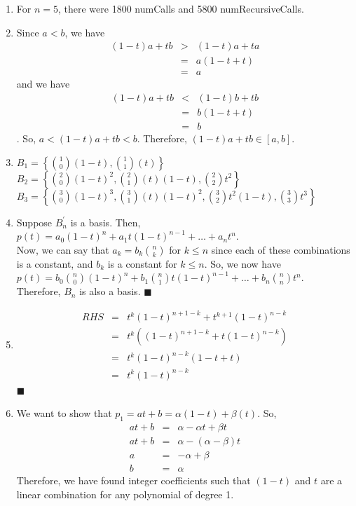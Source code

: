 \documentclass{article}
\newcommand*{\qed}{\hfill\ensuremath{\blacksquare}}
\begin{document}
\begin{enumerate}
\item For $n=5$, there were 1800 numCalls and 5800 numRecursiveCalls.

\item Since $a<b$, we have 
\begin{eqnarray*}
	(1-t)a + tb &>& (1-t)a + ta\\
	&=& a(1-t+t)\\
	&=& a
\end{eqnarray*}
and we have
\begin{eqnarray*}
	(1-t)a + tb &<& (1-t)b + tb\\
	&=& b(1-t+t)\\
	&=& b
\end{eqnarray*}
. So, $a < (1-t)a + tb < b$. Therefore, $(1-t)a + tb \in [a,b]$. 

\item $B_1 = \left\{{{1}\choose{0}} (1-t), {{1}\choose{1}} (t)\right\}$\\
$B_2 = \left\{{{2}\choose{0}} (1-t)^2, {{2}\choose{1}} (t)(1-t), {{2}\choose{2}} t^2 \right\}$\\
$B_3 = \left\{{{3}\choose{0}} (1-t)^3, {{3}\choose{1}} (t)(1-t)^2, {{3}\choose{2}} t^2(1-t), {{3}\choose{3}} t^3 \right\}$\\

\item Suppose $B_n^{'}$ is a basis. Then, \\
$p(t) = a_0(1-t)^n + a_1t(1-t)^{n-1} + \dots + a_nt^n$. \\
Now, we can say that $a_k = b_k {{n}\choose{k}}$ for $k\leq n$ since each of these combinations is a constant, and $b_k$ is a constant for $k \leq n$. So, we now have\\
$p(t) = b_0{{n}\choose{0}}(1-t)^n + b_1{{n}\choose{1}}t(1-t)^{n-1} + \dots + b_n{{n}\choose{n}}t^n$. \\
Therefore, $B_n$ is also a basis. \qed

\item 
\begin{eqnarray*}
	RHS &=& t^k(1-t)^{n+1-k} + t^{k+1}(1-t)^{n-k}\\
	&=& t^k((1-t)^{n+1-k}+t(1-t)^{n-k})\\
	&=& t^k(1-t)^{n-k}(1-t+t)\\
	&=& t^k(1-t)^{n-k} 
\end{eqnarray*}
\qed

\item We want to show that $p_1 = at + b = \alpha(1-t) + \beta(t)$. So, 
\begin{eqnarray*}
	at+b &=& \alpha - \alpha t + \beta t\\
	at+b &=& \alpha - (\alpha - \beta) t\\
	a &=& -\alpha + \beta\\
	b &=& \alpha
\end{eqnarray*}
Therefore, we have found integer coefficients such that $(1-t)$ and $t$ are a linear combination for any polynomial of degree 1. 


\end{enumerate}
\end{document}
